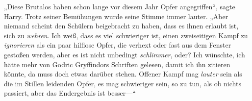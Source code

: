 „Diese Brutalos haben schon lange vor diesem Jahr Opfer angegriffen“, sagte Harry. Trotz seiner Bemühungen wurde seine Stimme immer lauter.
„Aber niemand scheint den Schülern beigebracht zu haben, dass es ihnen erlaubt ist, sich zu \emph{wehren}. Ich weiß, dass es viel schwieriger ist, einen zweiseitigen Kampf zu \emph{ignorieren} als ein paar hilflose Opfer, die verhext oder fast aus dem Fenster gestoßen werden, aber es ist nicht unbedingt \emph{schlimmer}, oder? Ich wünschte, ich hätte mehr von Godric Gryffindors Schriften gelesen, damit ich ihn zitieren könnte, da muss doch etwas darüber stehen. Offener Kampf mag \emph{lauter} sein als die im Stillen leidenden Opfer, es mag schwieriger sein, so zu tun, als ob nichts passiert, aber das Endergebnis ist besser—“

